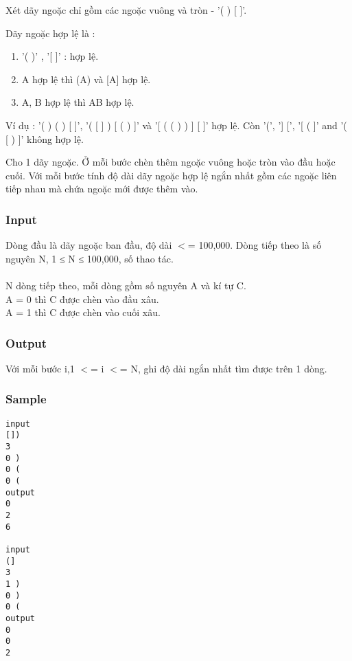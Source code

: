 

Xét dãy ngoặc chỉ gồm các ngoặc vuông và tròn - '( ) [ ]'.

Dãy ngoặc hợp lệ là :
\begin{enumerate}
	\item '( )' , '[ ]' : hợp lệ.
	\item A hợp lệ thì (A) và [A] hợp lệ.
	\item A, B hợp lệ thì AB hợp lệ.
\end{enumerate}

Ví dụ : '( ) ( ) [ ]', '( [ ] ) [ ( ) ]' và '[ ( ( ) ) ] [ ]' hợp lệ. Còn '(', '] [', '[ ( ]' and '( [ ) ]' không hợp lệ.

Cho 1 dãy ngoặc. Ở mỗi bước chèn thêm ngoặc vuông hoặc tròn vào đầu hoặc cuối. Với mỗi bước tính độ dài dãy ngoặc hợp lệ ngắn nhất gồm các ngoặc liên tiếp nhau mà chứa ngoặc mới được thêm vào.

\subsubsection{Input}

Dòng đầu là dãy ngoặc ban đầu, độ dài $<$= 100,000. Dòng tiếp theo là số nguyên N, 1 ≤ N ≤ 100,000, số thao tác.
\\
\\N dòng tiếp theo, mỗi dòng gồm số nguyên A và kí tự C.
\\A = 0 thì C được chèn vào đầu xâu.
\\A = 1 thì C được chèn vào cuối xâu.

\subsubsection{Output}

Với mỗi bước i,1 $<$= i $<$= N, ghi độ dài ngắn nhất tìm được trên 1 dòng.

\subsubsection{Sample}
\begin{verbatim}
input 
[]) 
3 
0 ) 
0 ( 
0 ( 
output 
0 
2 
6 

input 
(] 
3 
1 ) 
0 ) 
0 ( 
output 
0 
0 
2 
\end{verbatim}

 